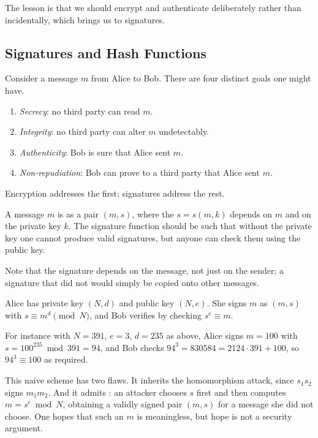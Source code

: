 \documentclass[a4paper]{scrartcl}
\begin{document}
The lesson is that we should encrypt and authenticate deliberately rather than incidentally, which brings us to signatures.

\subsection{Signatures and Hash Functions}

Consider a message $m$ from Alice to Bob. There are four distinct goals one might have.
\begin{enumerate}[label=(\roman*)]
	\item \emph{Secrecy}: no third party can read $m$.
	\item \emph{Integrity}: no third party can alter $m$ undetectably.
	\item \emph{Authenticity}: Bob is sure that Alice sent $m$.
	\item \emph{Non-repudiation}: Bob can prove to a third party that Alice sent $m$.
\end{enumerate}
Encryption addresses the first; signatures address the rest.

\begin{definition}[Signature]
	A message $m$ is  as a pair $(m,s)$, where the  $s = s(m,k)$ depends on $m$ and on the private key $k$. The signature function should be such that without the private key one cannot produce valid signatures, but anyone can check them using the public key.
\end{definition}

Note that the signature depends on the message, not just on the sender; a signature that did not would simply be copied onto other messages.

\begin{example}
	Alice has private key $(N,d)$ and public key $(N,e)$. She signs $m$ as $(m,s)$ with $s \equiv m^d\pmod N$, and Bob verifies by checking $s^e\equiv m$.

	For instance with $N = 391$, $e = 3$, $d = 235$ as above, Alice signs $m = 100$ with $s = 100^{235}\bmod391 = 94$, and Bob checks $94^3 = 830584 = 2124\cdot391+100$, so $94^3\equiv100$ as required.

	This naive scheme has two flaws. It inherits the homomorphism attack, since $s_1s_2$ signs $m_1m_2$. And it admits : an attacker chooses $s$ first and then computes $m = s^e\bmod N$, obtaining a validly signed pair $(m,s)$ for a message she did not choose. One hopes that such an $m$ is meaningless, but hope is not a security argument.
\end{example}
\end{document}
